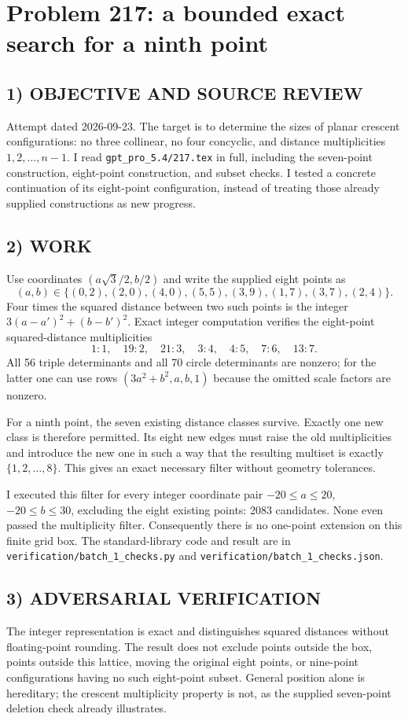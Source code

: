 \section{Problem 217: a bounded exact search for a ninth point}
\subsection*{1) OBJECTIVE AND SOURCE REVIEW}
Attempt dated 2026-09-23. The target is to determine the sizes of planar crescent configurations: no three collinear, no four concyclic, and distance multiplicities $1,2,\ldots,n-1$. I read \texttt{gpt\_pro\_5.4/217.tex} in full, including the seven-point construction, eight-point construction, and subset checks. I tested a concrete continuation of its eight-point configuration, instead of treating those already supplied constructions as new progress.
\subsection*{2) WORK}
Use coordinates $(a\sqrt3/2,b/2)$ and write the supplied eight points as
\[
(a,b)\in\{(0,2),(2,0),(4,0),(5,5),(3,9),(1,7),(3,7),(2,4)\}.
\]
Four times the squared distance between two such points is the integer $3(a-a')^2+(b-b')^2$. Exact integer computation verifies the eight-point squared-distance multiplicities
\[
1:1,\quad19:2,\quad21:3,\quad3:4,\quad4:5,\quad7:6,\quad13:7.
\]
All 56 triple determinants and all 70 circle determinants are nonzero; for the latter one can use rows $(3a^2+b^2,a,b,1)$ because the omitted scale factors are nonzero.

For a ninth point, the seven existing distance classes survive. Exactly one new class is therefore permitted. Its eight new edges must raise the old multiplicities and introduce the new one in such a way that the resulting multiset is exactly $\{1,2,\ldots,8\}$. This gives an exact necessary filter without geometry tolerances.

I executed this filter for every integer coordinate pair $-20\le a\le20$, $-20\le b\le30$, excluding the eight existing points: 2083 candidates. None even passed the multiplicity filter. Consequently there is no one-point extension on this finite grid box. The standard-library code and result are in \texttt{verification/batch\_1\_checks.py} and \texttt{verification/batch\_1\_checks.json}.
\subsection*{3) ADVERSARIAL VERIFICATION}
The integer representation is exact and distinguishes squared distances without floating-point rounding. The result does not exclude points outside the box, points outside this lattice, moving the original eight points, or nine-point configurations having no such eight-point subset. General position alone is hereditary; the crescent multiplicity property is not, as the supplied seven-point deletion check already illustrates.
